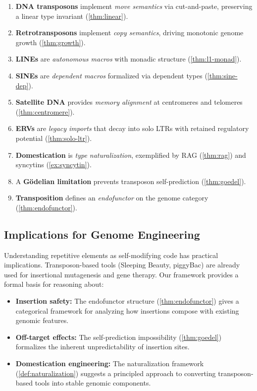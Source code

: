 \documentclass[12pt,a4paper]{article}
\begin{document}
\begin{enumerate}[label=\arabic*.]
  \item \textbf{DNA transposons} implement \emph{move semantics} via cut-and-paste,
    preserving a linear type invariant (\cref{thm:linear}).
  \item \textbf{Retrotransposons} implement \emph{copy semantics}, driving monotonic
    genome growth (\cref{thm:growth}).
  \item \textbf{LINEs} are \emph{autonomous macros} with monadic structure (\cref{thm:l1-monad}).
  \item \textbf{SINEs} are \emph{dependent macros} formalized via dependent types
    (\cref{thm:sine-dep}).
  \item \textbf{Satellite DNA} provides \emph{memory alignment} at centromeres and
    telomeres (\cref{thm:centromere}).
  \item \textbf{ERVs} are \emph{legacy imports} that decay into solo LTRs with
    retained regulatory potential (\cref{thm:solo-ltr}).
  \item \textbf{Domestication} is \emph{type naturalization}, exemplified by RAG
    (\cref{thm:rag}) and syncytins (\cref{ex:syncytin}).
  \item A \textbf{G\"odelian limitation} prevents transposon self-prediction
    (\cref{thm:goedel}).
  \item \textbf{Transposition} defines an \emph{endofunctor} on the genome category
    (\cref{thm:endofunctor}).
\end{enumerate}

\subsection{Implications for Genome Engineering}

Understanding repetitive elements as self-modifying code has practical implications.
Transposon-based tools (Sleeping Beauty, piggyBac) are already used for insertional
mutagenesis and gene therapy. Our framework provides a formal basis for reasoning about:

\begin{itemize}
  \item \textbf{Insertion safety:} The endofunctor structure (\cref{thm:endofunctor})
    gives a categorical framework for analyzing how insertions compose with existing
    genomic features.
  \item \textbf{Off-target effects:} The self-prediction impossibility (\cref{thm:goedel})
    formalizes the inherent unpredictability of insertion sites.
  \item \textbf{Domestication engineering:} The naturalization framework (\cref{def:naturalization})
    suggests a principled approach to converting transposon-based tools into stable
    genomic components.
\end{itemize}
\end{document}
